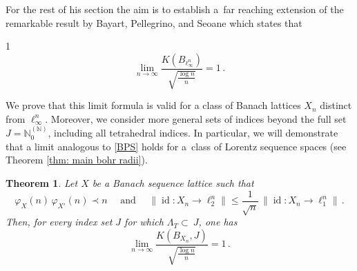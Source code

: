 \documentclass[12pt]{amsart}
\numberwithin{subsection}{section}
\newtheorem{theorem}{Theorem}[section]
\theoremstyle{definition}
\theoremstyle{remark}
\DeclareMathOperator{\id}{\mathrm{id}}
\begin{document}
For the rest of his section the aim is to establish a~far reaching extension of the remarkable result by Bayart, Pellegrino, and Seoane
\cite{bayart2014bohr} which states that
\begin{spacing}{1}
\begin{equation}\label{BPS}
\lim_{n \to \infty} \frac{K(B_{\ell_\infty^n})}{\sqrt{\frac{\log n}{n}}}  = 1\,.
\end{equation}
\end{spacing}

We prove that this limit formula is valid for a class of Banach lattices $X_n$ distinct from $\ell_\infty^n$. Moreover, we consider
more general sets of indices beyond the full set $J = \mathbb{N}_0^{(\mathbb{N})}$, including all tetrahedral indices. In particular,
we will demonstrate that a limit analogous to \eqref{BPS} holds for a~class of Lorentz sequence spaces (see Theorem \ref{thm: main bohr radii}).


\begin{theorem}\label{limits++}
Let $X$ be a  Banach sequence lattice such that
\[
\varphi_X(n)\,\varphi_{X'}(n) \prec n\quad \text{ and } \quad
\|\id\colon X_n \to \ell_2^{n}\| \leq \frac{1}{\sqrt{n}}\,\|\id\colon X_n \to \ell_1^{n}\|\,.
\]
Then, for every index set  $J$ for which $\Lambda_{T} \subset~J$, one has
\[
\lim_{n \to \infty} \frac{K(B_{X_n},J)}{\sqrt{\frac{\log n}{n}}}  = 1\,.
\]
\end{theorem}
\end{document}

